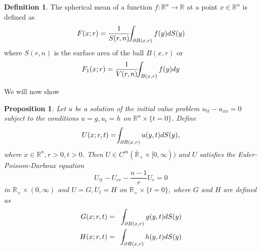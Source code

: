 \documentclass{article}
\newcommand{\fint}{\mbox{--}\mkern-16mu\int}
\theoremstyle{plain}
\numberwithin{thm}{section}
\theoremstyle{plain}
\newtheorem{prop}{Proposition}
\numberwithin{prop}{section}
\theoremstyle{definition}
\newtheorem{defn}{Definition}
\numberwithin{defn}{section}
\theoremstyle{remark}
\numberwithin{equation}{section}
\begin{document}
\begin{defn}\label{s28d1}
The spherical mean of a function $f : \mathbb{R}^n \rightarrow \mathbb{R}$ at a point $x \in \mathbb{R}^n$ is
defined as
\[
F(x; r) = \frac{1}{S(r, n)}\fint_{\partial B(x, r)} f(y)dS(y)
\]
where $S(r, n)$ is the surface area of the ball $B(x, r)$ or
\[
F_1(x; r) = \frac{1}{V(r, n)}\fint_{B(x, r)} f(y)dy
\]
\end{defn}

We will now show 
\begin{prop}\label{s28p1}
Let $u$ be a solution of the initial value problem $u_{tt} - u_{xx} = 0$ subject to the conditions $u = g, u_t = h$
on $\mathbb{R}^n \times \{t = 0\}$. Define
\begin{equation}\label{s28e11}
U(x; r, t) = \fint_{\partial B(x,r)}u(y, t)dS(y),
\end{equation}
where $x \in \mathbb{R}^n, r > 0, t > 0$. Then $U \in C^m(\bar{\mathbb{R}}_+ \times [0, \infty))$ and $U$ 
satisfies the Euler-Poisson-Darboux equation 
\begin{equation}\label{s28e12}
U_{tt} - U_{rr} - \frac{n - 1}{r}U_r = 0
\end{equation} 
in $\mathbb{R}_+ \times (0, \infty)$ and $U = G, U_t = H$ on $\mathbb{R}_+ \times \{t = 0\}$, where $G$ and $H$
are defined as
\begin{eqnarray}
G(x; r, t) &=& \fint_{\partial B(x,r)}g(y, t)dS(y) \label{s28e13}\\
H(x; r, t) &=& \fint_{\partial B(x,r)}h(y, t)dS(y) \label{s28e14}
\end{eqnarray}
\end{prop}
\end{document}
